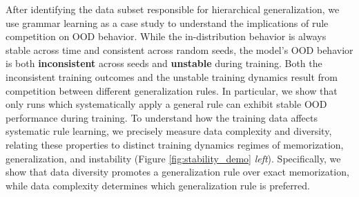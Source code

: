 After identifying the data subset responsible for hierarchical generalization, we use grammar learning as a case study to understand the implications of rule competition on OOD behavior.
While the in-distribution behavior is always stable across time and consistent across random seeds, the model's OOD behavior is both \textbf{inconsistent} across seeds and \textbf{unstable} during training. 
Both the inconsistent training outcomes and the unstable training dynamics result from competition between different generalization rules. In particular, we show that only runs which systematically apply a general rule can exhibit stable OOD performance during training. 
To understand how the training data affects systematic rule learning, we precisely measure data complexity and diversity, relating these properties to distinct training dynamics regimes of memorization, generalization, and instability (Figure \ref{fig:stability_demo} \textit{left}). Specifically, we show that 
data diversity promotes a generalization rule over exact memorization, while data complexity determines which generalization rule is preferred. 


